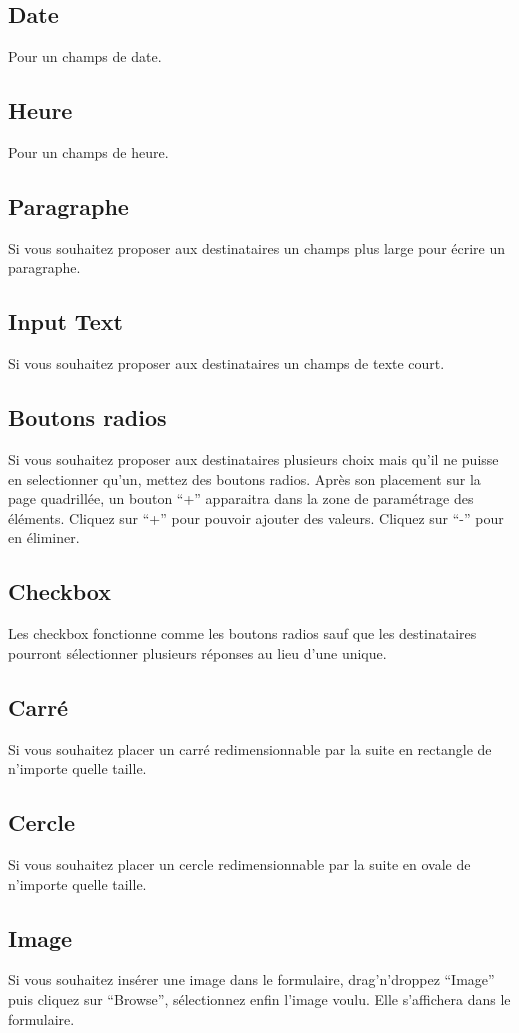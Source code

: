 \documentclass[a4paper,11pt,final]{report}
\begin{document}
\subsection{Date}
Pour un champs de date.
\subsection{Heure}
Pour un champs de heure.
\subsection{Paragraphe}
Si vous souhaitez proposer aux destinataires un champs plus large pour écrire un paragraphe.
\subsection{Input Text}
Si vous souhaitez proposer aux destinataires un champs de texte court.
\subsection{Boutons radios}
Si vous souhaitez proposer aux destinataires plusieurs choix mais qu'il ne puisse en selectionner qu'un, mettez des boutons radios. Après son placement sur la page quadrillée, un bouton ``+'' apparaitra dans la zone de paramétrage des éléments. Cliquez sur ``+'' pour pouvoir ajouter des valeurs. Cliquez sur ``-'' pour en éliminer.
\subsection{Checkbox}
Les checkbox fonctionne comme les boutons radios sauf que les destinataires pourront sélectionner plusieurs réponses au lieu d'une unique.
\subsection{Carré}
Si vous souhaitez placer un carré redimensionnable par la suite en rectangle de n'importe quelle taille.
\subsection{Cercle}
Si vous souhaitez placer un cercle redimensionnable par la suite en ovale de n'importe quelle taille.
\subsection{Image}
Si vous souhaitez insérer une image dans le formulaire, drag'n'droppez ``Image'' puis cliquez sur ``Browse'', sélectionnez enfin l'image voulu. Elle s'affichera dans le formulaire.
\end{document}

